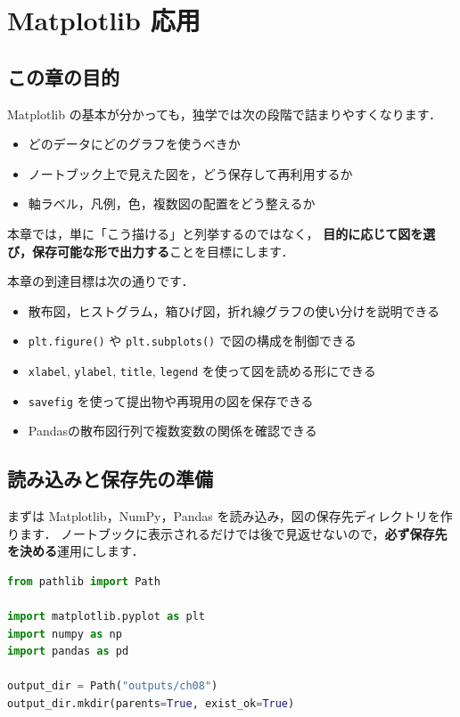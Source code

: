
\chapter{Matplotlib 応用}


\section{この章の目的}

Matplotlib の基本が分かっても，独学では次の段階で詰まりやすくなります．
\begin{itemize}
\item どのデータにどのグラフを使うべきか
\item ノートブック上で見えた図を，どう保存して再利用するか
\item 軸ラベル，凡例，色，複数図の配置をどう整えるか
\end{itemize}

本章では，単に「こう描ける」と列挙するのではなく，
\textbf{目的に応じて図を選び，保存可能な形で出力する}ことを目標にします．

本章の到達目標は次の通りです．
\begin{itemize}
\item 散布図，ヒストグラム，箱ひげ図，折れ線グラフの使い分けを説明できる
\item \texttt{plt.figure()} や \texttt{plt.subplots()} で図の構成を制御できる
\item \texttt{xlabel}, \texttt{ylabel}, \texttt{title}, \texttt{legend} を使って図を読める形にできる
\item \texttt{savefig} を使って提出物や再現用の図を保存できる
\item Pandasの散布図行列で複数変数の関係を確認できる
\end{itemize}


\section{読み込みと保存先の準備}

まずは Matplotlib，NumPy，Pandas を読み込み，図の保存先ディレクトリを作ります．
ノートブックに表示されるだけでは後で見返せないので，\textbf{必ず保存先を決める}運用にします．

\begin{lstlisting}[style=codecell,language=Python]
from pathlib import Path

import matplotlib.pyplot as plt
import numpy as np
import pandas as pd

output_dir = Path("outputs/ch08")
output_dir.mkdir(parents=True, exist_ok=True)
\end{lstlisting}

